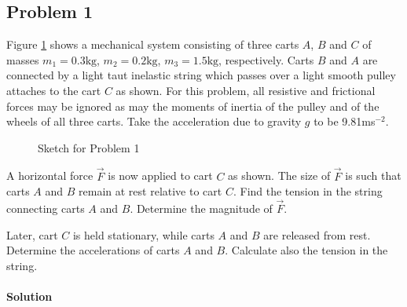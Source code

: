 \documentclass[12pt,a4paper]{book}
\begin{document}
	\subsection*{Problem 1}
	Figure \ref{sketch_3_1_1} shows a mechanical system consisting of three carts $A$, $B$ and $C$ of masses $m_1=0.3\text{kg}$, $m_2=0.2\text{kg}$, $m_3=1.5\text{kg}$, respectively. Carts $B$ and $A$ are connected by a light taut inelastic string which passes over a light smooth pulley attaches to the cart $C$ as shown. For this problem, all resistive and frictional forces may be ignored as may the moments of inertia of the pulley and of the wheels of all three carts. Take the acceleration due to gravity $g$ to be 9.81ms$^{-2}$.
	\begin{figure}
		[!hbtp]
		\centering
		\caption{Sketch for Problem 1}
		\label{sketch_3_1_1}
	\end{figure}\par
	A horizontal force $\vec{F}$ is now applied to cart $C$ as shown. The size of $\vec{F}$ is such that carts $A$ and $B$ remain at rest relative to cart $C$. Find the tension in the string connecting carts $A$ and $B$. Determine the magnitude of $\vec{F}$.\par
	Later, cart $C$ is held stationary, while carts $A$ and $B$ are released from rest. Determine the accelerations of carts $A$ and $B$. Calculate also the tension in the string.\\ \\
	\textbf{Solution}\\
\end{document}
